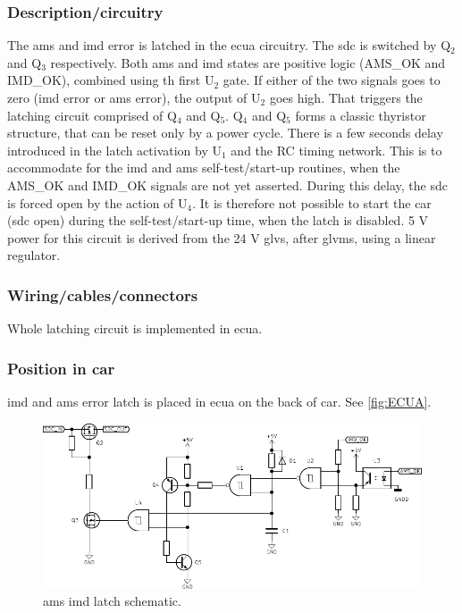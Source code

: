 \subsubsection{Description/circuitry}
The \gls{ams} and \gls{imd} error is latched in the \gls{ecua} circuitry. The \gls{sdc} is switched by Q$_2$ and Q$_3$ respectively. Both \gls{ams} and \gls{imd} states are positive logic (AMS\_OK and IMD\_OK), combined using th first U$_2$ gate. If either of the two signals goes to zero (\gls{imd} error or \gls{ams} error), the output of U$_2$ goes high. That triggers the latching circuit comprised of Q$_4$ and Q$_5$. Q$_4$ and Q$_5$ forms a classic thyristor structure, that can be reset only by a power cycle.  There is a few seconds delay introduced in the latch activation by U$_1$ and the RC timing network. This is to accommodate for the \gls{imd} and \gls{ams} self-test/start-up routines, when the AMS\_OK and IMD\_OK signals are not yet asserted. During this delay, the \gls{sdc} is forced open by the action of U$_4$. It is therefore not possible to start the car (\gls{sdc} open) during the self-test/start-up time, when the latch is disabled.
5 V power for this circuit is derived from the 24 V \gls{glvs}, after \gls{glvms}, using a linear regulator.


\subsubsection{Wiring/cables/connectors}
Whole latching circuit is implemented in \gls{ecua}.


\subsubsection{Position in car}
\Gls{imd} and \gls{ams} error latch is placed in \gls{ecua} on the back of car. See \ref{fig:ECUA}.

\begin{figure}[H]
	\centering
	\includegraphics[width=\textwidth]{./img/ECUA_imd_ams_latch.pdf}
	\caption{\Gls{ams} \gls{imd} latch schematic.}
	\label{}
\end{figure}